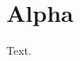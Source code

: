 \documentclass{article}
\begin{document}
\tableofcontents
\listoffigures
\section{Alpha}
Text.
\end{document}
